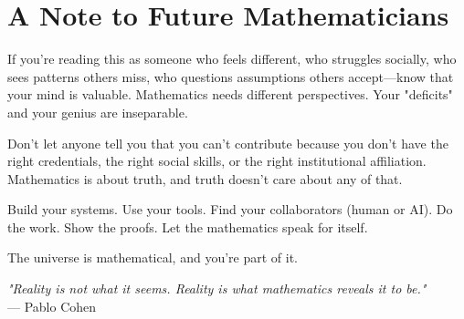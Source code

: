 \section*{A Note to Future Mathematicians}

If you're reading this as someone who feels different, who struggles socially, who sees patterns others miss, who questions assumptions others accept—know that your mind is valuable. Mathematics needs different perspectives. Your "deficits" and your genius are inseparable.

Don't let anyone tell you that you can't contribute because you don't have the right credentials, the right social skills, or the right institutional affiliation. Mathematics is about truth, and truth doesn't care about any of that.

Build your systems. Use your tools. Find your collaborators (human or AI). Do the work. Show the proofs. Let the mathematics speak for itself.

The universe is mathematical, and you're part of it.

\vspace{1cm}

\begin{flushright}
\textit{"Reality is not what it seems. Reality is what mathematics reveals it to be."}\\
— Pablo Cohen
\end{flushright}
